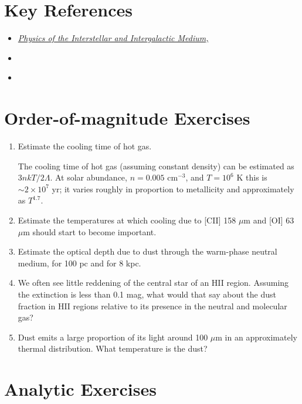 \section{Key References}

\begin{itemize}
  \item
    \href{http://}
    {\it Physics of the Interstellar and Intergalactic Medium,
      \citet{draine07a}}
\item \citet{bolatto13a}
\item \citet{kalberla09a}
\end{itemize}

\section{Order-of-magnitude Exercises}

\begin{enumerate} 
\item Estimate the cooling time of hot gas.
\begin{answer}
The cooling time of hot gas (assuming constant density) can be
estimated as $3nkT / 2 \Lambda$. At solar abundance, $n=0.005$
cm$^{-3}$, and $T=10^6$ K this is $\sim 2 \times 10^7$ yr; it varies
roughly in proportion to metallicity and approximately as $T^{1.7}$.
\end{answer}
\item Estimate the temperatures at which cooling due to [CII]
158 $\mu$m and [OI] 63 $\mu$m should start to become important.
\item Estimate the optical depth due to dust through the warm-phase neutral
medium, for 100 pc and for 8 kpc.
\item We often see little reddening of the central star of an HII
region. Assuming the extinction is less than 0.1 mag, what would that
say about the dust fraction in HII regions relative to its presence in
the neutral and molecular gas?
\item Dust emits a large proportion of its light around 100 $\mu$m in
an approximately thermal distribution. What temperature is the dust?
\end{enumerate}   

\section{Analytic Exercises}


